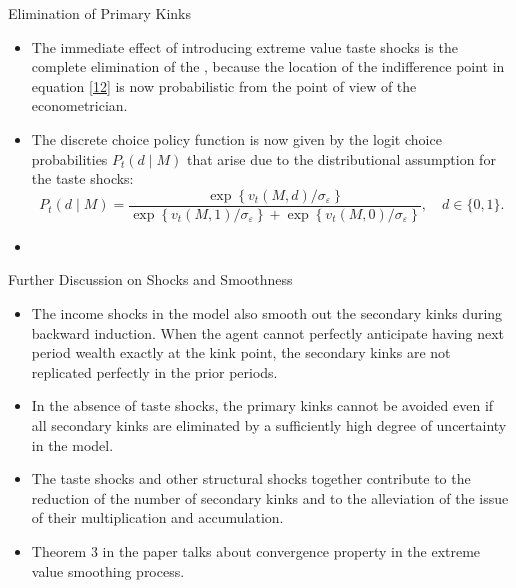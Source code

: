\documentclass[aspectratio=169]{beamer}
\newcommand{\highlight}[1]{{\color{red}{#1}}}
\begin{document}
\begin{frame}{Elimination of Primary Kinks}
	\begin{itemize}
		\item The immediate effect of introducing extreme value taste shocks is the complete elimination of the \highlight{primary kinks}, because the location of the indifference point in equation \ref{12} is now probabilistic from the point of view of the econometrician.
		\item The discrete choice policy function is now given by the logit choice probabilities $P_t(d \mid M)$ that arise due to the distributional assumption for the taste shocks:
		\begin{equation}
			\label{15}
			P_t(d \mid M)=\frac{\exp \left\{v_t(M, d) / \sigma_{\varepsilon}\right\}}{\exp \left\{v_t(M, 1) / \sigma_{\varepsilon}\right\}+\exp \left\{v_t(M, 0) / \sigma_{\varepsilon}\right\}}, \quad d \in\{0,1\} .
		\end{equation}
		
		\item \highlight{It is worth noting that the problem is still not globally concave in general, so the upper envelope calculation and the elimination of the suboptimal endogenous points still should be performed as before.} 
	\end{itemize}
\end{frame}

\begin{frame}{Further Discussion on Shocks and Smoothness}
	\begin{itemize}
		\item The income shocks in the model also smooth out the secondary kinks during backward induction. When the agent cannot perfectly anticipate having next period wealth exactly at the kink point, the secondary kinks are not replicated perfectly in the prior periods.
		\item In the absence of taste shocks, the primary kinks cannot be avoided even if all secondary kinks are eliminated by a sufficiently high degree of uncertainty in the model.
		\item The taste shocks and other structural shocks together contribute to the reduction of the number of secondary kinks and to the alleviation of the issue of their multiplication and accumulation.
		\item Theorem 3 in the paper talks about convergence property in the extreme value smoothing process.
	\end{itemize}
\end{frame}
\end{document}
